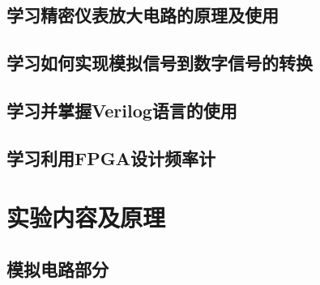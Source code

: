 \documentclass[12pt,a4paper]{ctexart}
\begin{document}
\subsection{学习精密仪表放大电路的原理及使用}
\subsection{学习如何实现模拟信号到数字信号的转换}
\subsection{学习并掌握Verilog语言的使用}
\subsection{学习利用FPGA设计频率计}


\section{实验内容及原理}

\subsection{模拟电路部分}
\end{document}
